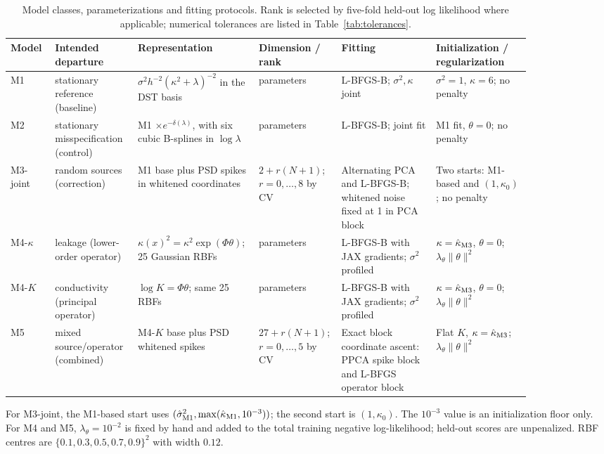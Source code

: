 \documentclass[11pt]{article}
\numberwithin{table}{section}
\numberwithin{figure}{section}
\begin{document}
\begin{table}[htbp]
\centering
\caption{Model classes, parameterizations and fitting protocols. Rank is selected by five-fold held-out log likelihood where applicable; numerical tolerances are listed in Table~\ref{tab:tolerances}.}
\label{tab:models}
\small
\renewcommand{\arraystretch}{1.15}
\begin{tabular}{@{}>{\raggedright\arraybackslash}p{0.08\linewidth}>{\raggedright\arraybackslash}p{0.13\linewidth}>{\raggedright\arraybackslash}p{0.19\linewidth}>{\raggedright\arraybackslash}p{0.12\linewidth}>{\raggedright\arraybackslash}p{0.17\linewidth}>{\raggedright\arraybackslash}p{0.17\linewidth}@{}}
\toprule
Model & Intended departure & Representation & Dimension / rank & Fitting & Initialization / regularization \\
\midrule
M1 &
stationary reference (baseline) &
$\sigma^2h^{-2}(\kappa^2+\lambda)^{-2}$ in the DST basis &
2 parameters &
L-BFGS-B; $\sigma^2,\kappa$ joint &
$\sigma^2=1$, $\kappa=6$; no penalty \\

M2 &
stationary misspecification (control) &
M1 $\times e^{-\delta(\lambda)}$, with six cubic B-splines in $\log\lambda$ &
8 parameters &
L-BFGS-B; joint fit &
M1 fit, $\theta=0$; no penalty \\

M3-joint &
random sources (correction) &
M1 base plus PSD spikes in whitened coordinates &
$2+r(N+1)$; $r=0,\ldots,8$ by CV &
Alternating PCA and L-BFGS-B; whitened noise fixed at 1 in PCA block &
Two starts: M1-based and $(1,\kappa_0)$; no penalty \\

M4-$\kappa$ &
leakage (lower-order operator) &
$\kappa(x)^2=\kappa^2\exp(\Phi\theta)$; 25 Gaussian RBFs &
27 parameters &
L-BFGS-B with JAX gradients; $\sigma^2$ profiled &
$\kappa=\hat\kappa_{\rm M3}$, $\theta=0$; $\lambda_\theta\|\theta\|^2$ \\

M4-$K$ &
conductivity (principal operator) &
$\log K=\Phi\theta$; same 25 RBFs &
27 parameters &
L-BFGS-B with JAX gradients; $\sigma^2$ profiled &
$\kappa=\hat\kappa_{\rm M3}$, $\theta=0$; $\lambda_\theta\|\theta\|^2$ \\

M5 &
mixed source/operator (combined) &
M4-$K$ base plus PSD whitened spikes &
$27+r(N+1)$; $r=0,\ldots,5$ by CV &
Exact block coordinate ascent: PPCA spike block and L-BFGS operator block &
Flat $K$, $\kappa=\hat\kappa_{\rm M3}$; $\lambda_\theta\|\theta\|^2$ \\
\bottomrule
\end{tabular}

\vspace{0.4em}
\footnotesize
For M3-joint, the M1-based start uses $(\hat\sigma^2_{\rm M1},\max(\hat\kappa_{\rm M1},10^{-3}))$; the second start is $(1,\kappa_0)$. The $10^{-3}$ value is an initialization floor only. For M4 and M5, $\lambda_\theta=10^{-2}$ is fixed by hand and added to the total training negative log-likelihood; held-out scores are unpenalized. RBF centres are $\{0.1,0.3,0.5,0.7,0.9\}^2$ with width $0.12$.
\end{table}
\end{document}
